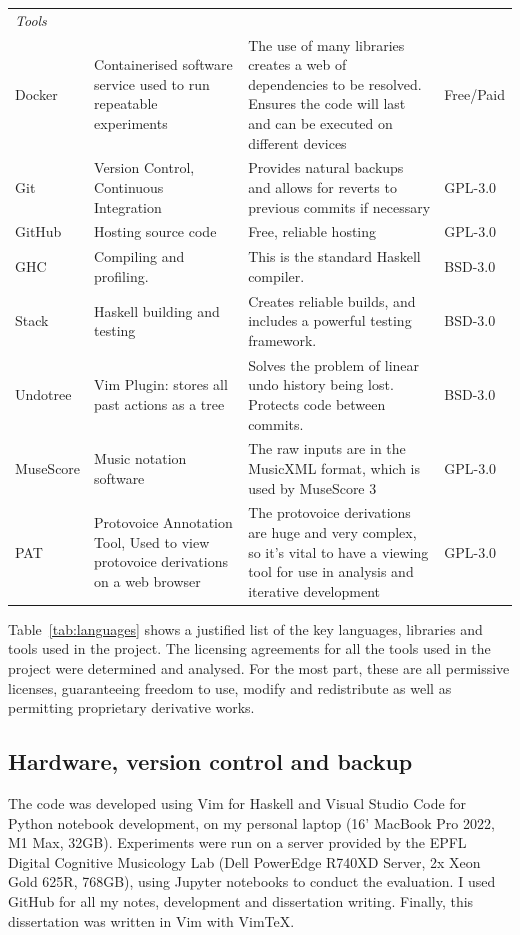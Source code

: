 \documentclass[12pt,a4paper,twoside,openright]{report}
\theoremstyle{definition}
\begin{document}
\begin{table}[h!]
\begin{tabularx}{\textwidth}{p{4em}X X p{4em}}
    \textit{Tools} &&&\\
    Docker & Containerised software service used to run repeatable experiments 
           & The use of many libraries creates a web of dependencies to be resolved. Ensures the code will last and can be executed on different devices 
           & Free/Paid \\
    Git & Version Control, Continuous Integration 
        & Provides natural backups and allows for reverts to previous commits if necessary
        & GPL-3.0 \\
    GitHub & Hosting source code
           & Free, reliable hosting
           & GPL-3.0 \\
    GHC & Compiling and profiling.
        & This is the standard Haskell compiler. 
        & BSD-3.0 \\
    Stack & Haskell building and testing  
        & Creates reliable builds, and includes a powerful testing framework.
        & BSD-3.0 \\
    Undotree & Vim Plugin: stores all past actions as a tree 
        & Solves the problem of linear undo history being lost. Protects code between commits. 
        & BSD-3.0 \\
    MuseScore & Music notation software 
                & The raw inputs are in the MusicXML format, which is used by MuseScore 3
                & GPL-3.0 \\
    PAT & Protovoice Annotation Tool, Used to view protovoice derivations on a web browser 
          & The protovoice derivations are huge and very complex, so it's vital to have a viewing tool for use in analysis and iterative development
        & GPL-3.0 \\
  \end{tabularx}
\end{table}

Table~\ref{tab:languages} shows a justified list of the key languages, libraries and tools used in the project. The licensing agreements for all the tools used in the project were determined and analysed. For the most part, these are all permissive licenses, guaranteeing freedom to use, modify and redistribute as well as permitting proprietary derivative works. 

\subsection{Hardware, version control and backup}
The code was developed using Vim for Haskell and Visual Studio Code for Python notebook development, on my personal laptop (16' MacBook Pro 2022, M1 Max, 32GB). 
Experiments were run on a server provided by the EPFL Digital Cognitive Musicology Lab (Dell PowerEdge R740XD Server, 2x Xeon Gold 625R, 768GB), using Jupyter notebooks to conduct the evaluation. I used GitHub for all my notes, development and dissertation writing. Finally, this dissertation was written in Vim with VimTeX.
\end{document}
